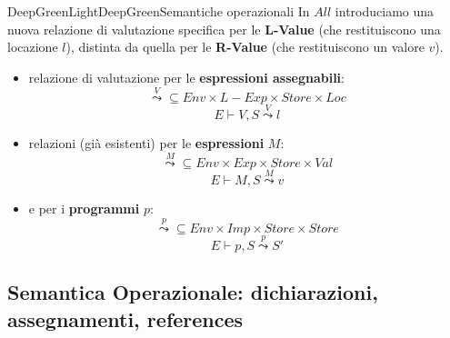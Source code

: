 \documentclass[a4paper,11pt]{report}
\begin{document}
\begin{cdefframe}{DeepGreenLight}{DeepGreen}{Semantiche operazionali}{}
In \( All \) introduciamo una nuova relazione di valutazione specifica per le \textbf{L-Value} (che restituiscono una locazione $l$), distinta da quella per le \textbf{R-Value} (che restituiscono un valore $v$).

    \begin{itemize}
        \item relazione di valutazione per le \textbf{espressioni assegnabili}:
            \[
                \overset{V}{\leadsto} \subseteq Env \times L-Exp \times Store \times Loc
            \]
            \[ E \vdash V, S\overset{V}{\leadsto} l \]
        \item relazioni (già esistenti) per le \textbf{espressioni} \( M \):
            \[ \overset{M}{\leadsto} \subseteq Env \times Exp \times Store \times Val \]
            \[ E \vdash M, S \overset{M}{\leadsto} v \]

        \item e per i \textbf{programmi} \( p \):             
            \[ \overset{p}{\leadsto} \subseteq  Env \times Imp \times Store \times Store \]
            \[ E \vdash p, S \overset{p}{\leadsto} S' \]
    \end{itemize}
\end{cdefframe}


\subsection{Semantica Operazionale: dichiarazioni, assegnamenti, references} 
\end{document}

